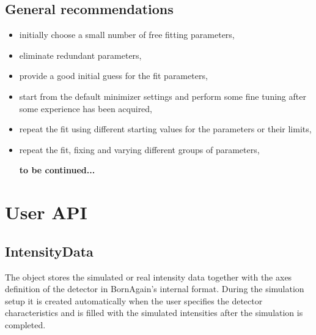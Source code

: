 \subsection*{General recommendations}
\begin{itemize}
\item initially choose  a small number of free fitting parameters,
\item eliminate redundant parameters,
\item provide a good initial guess for the fit parameters,
\item start from the default minimizer settings and perform some fine tuning after some experience has been acquired,
\item repeat the fit using different starting values for the parameters or their limits,
\item repeat the fit, fixing and varying different groups of parameters,




{\bf to be continued... }


\end{itemize}


\section{User API} \label{UserAPI}

\subsection{IntensityData}

The  object stores the 
simulated or real intensity data together with the axes definition of the detector in BornAgain's internal format. 
During the simulation setup
it is created automatically when the user specifies the detector characteristics and is filled with the simulated intensities after the simulation is completed.

